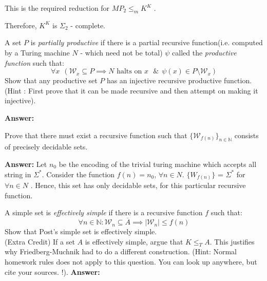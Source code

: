 \documentclass[addpoints,12pt]{exam}
\renewcommand{\W}{\mathcal{W}}
\begin{document}
\begin{questions}
\begin{parts}
\begin{itemize}
 This is the required reduction for $MP_{2} \leq_{m} K^K$ . \newline
 
 Therefore, $K^K$ is $\Sigma_{2}$ - complete.
 
\end{itemize}



\end{parts}

\question[10] A set $P$ is \textit{partially productive} if there is a partial recursive function(i.e. computed by a Turing machine $N$ - which need not be total) $\psi$ called the {\em productive function} such that:
\[ \forall x ~~\left( \mathcal{W}_x \subseteq P \implies N \textrm{ halts on $x$ } 
\&~~\psi(x) \in P \setminus \mathcal{W}_x \right) \]
Show that any productive set $P$ has an injective recursive productive function. \\ (Hint : First prove that it can be made recursive and then attempt on making it injective).

\textbf{Answer:}\newline


\question[5]
Prove that there must exist a recursive function such that $\{ \W_{f(n)} \}_{n \in \mathbb{N}}$ consists of precisely decidable sets.

\textbf{Answer:}\newline
Let $n_{0}$ be the encoding of the trivial turing machine which accepts all string in $\Sigma^{\ast}$. \newline
Consider the function $f(n) = n_{0}$, $\forall n \in N$. \newline
$\{ W_{f(n)} \}$ = $\Sigma^\ast$ for $\forall n \in N$ . Hence, this set has only decidable sets, for this particular recursive function.



\question[5]
A simple set is {\em effectively simple} if there is a recursive function $f$ such that:
\[ \forall n\in \mathbb{N} : \W_n \subseteq \overline{A} \implies |\W_n| \le f(n) \]
Show that Post's simple set is effectively simple. \\[2mm]
(Extra Credit) If a set $A$ is effectively simple, argue that $K \le_T A$. This justifies why Friedberg-Muchnik had to do a different construction. 
(Hint: Normal homework rules does not apply to this question. You can look up anywhere, but cite your sources. !).
\textbf{Answer:}\newline


\end{questions}
\end{document}
